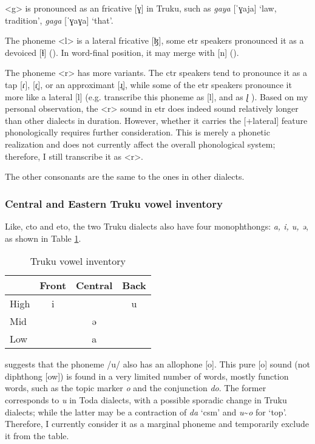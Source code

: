<g> is pronounced as an fricative [ɣ] in Truku, such as \textit{gaya} [ˈɣaja] `law, tradition', \textit{gaga} [ˈɣaɣa] `that'.

The phoneme <l> is a lateral fricative [ɮ], some \acl{etr} speakers pronounced it as a devoiced [ɬ] (\cite[16]{Lee2018Trugrammar}). In word-final position, it may merge with [n] (\cite[16,23]{Lee2018Trugrammar}). 

The phoneme <r> has more variants. The \acl{ctr} speakers tend to pronounce it as a tap [ɾ], [ɾ̠], or an approximant [ɹ̠], while some of the \acl{etr} speakers pronounce it more like a lateral [l] (e.g. \textcite{Chengetal2017Truku} transcribe this phoneme as [l], and \textcite{ogawaandasai1935} as \textit{ɭ} ). Based on my personal observation, the <r> sound in \acl{etr} does indeed sound relatively longer than other dialects in duration. However, whether it carries the [+lateral] feature phonologically requires further consideration. This is merely a phonetic realization and does not currently affect the overall phonological system; therefore, I still transcribe it as <r>.

The other consonants are the same to the ones in other dialects. 

\subsubsection{Central and Eastern Truku vowel inventory}

Like, \acl{cto} and \acl{eto}, the two Truku dialects also have four monophthongs: \textit{a, i, u, ə}, as shown in Table \ref{tab:trV}. 

\begin{table}[!htbp]
\centering
\caption{Truku vowel inventory}
\label{tab:trV}
\begin{tabular}{lccc}
\hline
     & Front & Central & Back \\ \hline
High &  i    &         &  u   \\
Mid  &       &  ə      &      \\
Low  &       &  a      &      \\ \hline
\end{tabular}
\end{table}

\textcite[12]{Lee2018Trugrammar} suggests that the phoneme /u/ also has an allophone [o]. This pure [o] sound (not diphthong [ow]) is found in a very limited number of words, mostly function words, such as the topic marker \textit{o} and the conjunction \textit{do}. The former corresponds to \textit{u} in Toda dialects, with a possible sporadic change in Truku dialects; while the latter may be a contraction of \textit{da} `\acs{csm}' and \textit{u}\~{}\textit{o} for `\acs{top}'. Therefore, I currently consider it as a marginal phoneme and temporarily exclude it from the table.

